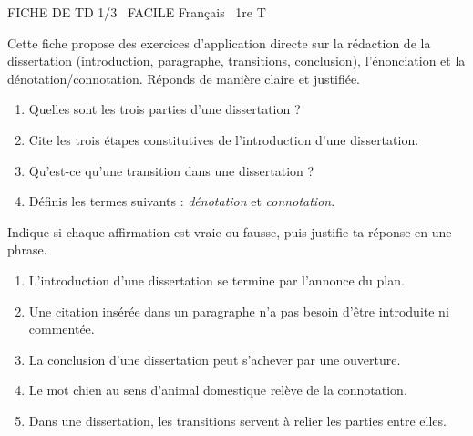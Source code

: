 \documentclass[11pt]{article}
\begin{document}
\begin{tcolorbox}[enhanced,colback=popink,colframe=popink,arc=10pt,boxrule=0pt,left=12pt,right=12pt,top=9pt,bottom=9pt]
{\color{white}\popxbold\small FICHE DE TD 1/3 \textbullet\ FACILE \hfill Français \textbullet\ 1re T\par}
\end{tcolorbox}
\vspace{4pt}
Cette fiche propose des exercices d'application directe sur la rédaction de la dissertation (introduction, paragraphe, transitions, conclusion), l'énonciation et la dénotation/connotation. Réponds de manière claire et justifiée.

\begin{exercice}
\begin{enumerate}
\item Quelles sont les trois parties d'une dissertation ?
\item Cite les trois étapes constitutives de l'introduction d'une dissertation.
\item Qu'est-ce qu'une transition dans une dissertation ?
\item Définis les termes suivants : \emph{dénotation} et \emph{connotation}.
\end{enumerate}
\end{exercice}

\begin{exercice}
Indique si chaque affirmation est vraie ou fausse, puis justifie ta réponse en une phrase.
\begin{enumerate}
\item L'introduction d'une dissertation se termine par l'annonce du plan.
\item Une citation insérée dans un paragraphe n'a pas besoin d'être introduite ni commentée.
\item La conclusion d'une dissertation peut s'achever par une ouverture.
\item Le mot \og{}chien\og{} au sens d'animal domestique relève de la connotation.
\item Dans une dissertation, les transitions servent à relier les parties entre elles.
\end{enumerate}
\end{exercice}
\end{document}
